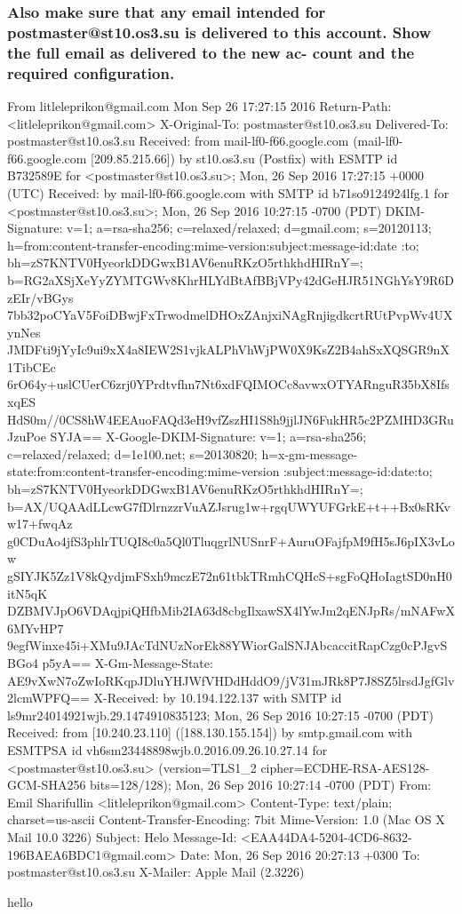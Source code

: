 \documentclass[a4paper,11pt]{article}
\begin{document}
\subsubsection{Also make sure that any email intended for postmaster@st10.os3.su is delivered to this account. Show the full email as delivered to the new ac- count and the required configuration.}
\begin{bashcode}
From litleleprikon@gmail.com  Mon Sep 26 17:27:15 2016
Return-Path: <litleleprikon@gmail.com>
X-Original-To: postmaster@st10.os3.su
Delivered-To: postmaster@st10.os3.su
Received: from mail-lf0-f66.google.com (mail-lf0-f66.google.com [209.85.215.66])
    by st10.os3.su (Postfix) with ESMTP id B732589E
    for <postmaster@st10.os3.su>; Mon, 26 Sep 2016 17:27:15 +0000 (UTC)
Received: by mail-lf0-f66.google.com with SMTP id b71so9124924lfg.1
        for <postmaster@st10.os3.su>; Mon, 26 Sep 2016 10:27:15 -0700 (PDT)
DKIM-Signature: v=1; a=rsa-sha256; c=relaxed/relaxed;
        d=gmail.com; s=20120113;
        h=from:content-transfer-encoding:mime-version:subject:message-id:date
         :to;
        bh=zS7KNTV0HyeorkDDGwxB1AV6enuRKzO5rthkhdHIRnY=;
        b=RG2aXSjXeYyZYMTGWv8KhrHLYdBtAfBBjVPy42dGeHJR51NGhYsY9R6DzEIr/vBGys
         7bb32poCYaV5FoiDBwjFxTrwodmelDHOxZAnjxiNAgRnjigdkcrtRUtPvpWv4UXynNes
         JMDFti9jYyIc9ui9xX4a8IEW2S1vjkALPhVhWjPW0X9KsZ2B4ahSxXQSGR9nX1TibCEc
         6rO64y+uslCUerC6zrj0YPrdtvfhn7Nt6xdFQIMOCc8avwxOTYARnguR35bX8IfsxqES
         HdS0m//0CS8hW4EEAuoFAQd3eH9vfZszHI1S8h9jjlJN6FukHR5c2PZMHD3GRuJzuPoe
         SYJA==
X-Google-DKIM-Signature: v=1; a=rsa-sha256; c=relaxed/relaxed;
        d=1e100.net; s=20130820;
        h=x-gm-message-state:from:content-transfer-encoding:mime-version
         :subject:message-id:date:to;
        bh=zS7KNTV0HyeorkDDGwxB1AV6enuRKzO5rthkhdHIRnY=;
        b=AX/UQAAdLLcwG7fDlrnzzrVuAZJsrug1w+rgqUWYUFGrkE+t++Bx0sRKvw17+fwqAz
         g0CDuAo4jfS3phlrTUQI8c0a5Ql0TluqgrlNUSnrF+AuruOFajfpM9fH5sJ6pIX3vLow
         gSIYJK5Zz1V8kQydjmFSxh9mczE72n61tbkTRmhCQHcS+sgFoQHoIagtSD0nH0itN5qK
         DZBMVJpO6VDAqjpiQHfbMib2IA63d8cbgIlxawSX4lYwJm2qENJpRs/mNAFwX6MYvHP7
         9egfWinxe45i+XMu9JAcTdNUzNorEk88YWiorGalSNJAbcaccitRapCzg0cPJgvSBGo4
         p5yA==
X-Gm-Message-State: AE9vXwN7oZwIoRKqpJDluYHJWfVHDdHddO9/jV31mJRk8P7J8SZ5lrsdJgfGlv2lcmWPFQ==
X-Received: by 10.194.122.137 with SMTP id ls9mr24014921wjb.29.1474910835123;
        Mon, 26 Sep 2016 10:27:15 -0700 (PDT)
Received: from [10.240.23.110] ([188.130.155.154])
        by smtp.gmail.com with ESMTPSA id vh6sm23448898wjb.0.2016.09.26.10.27.14
        for <postmaster@st10.os3.su>
        (version=TLS1_2 cipher=ECDHE-RSA-AES128-GCM-SHA256 bits=128/128);
        Mon, 26 Sep 2016 10:27:14 -0700 (PDT)
From: Emil Sharifullin <litleleprikon@gmail.com>
Content-Type: text/plain; charset=us-ascii
Content-Transfer-Encoding: 7bit
Mime-Version: 1.0 (Mac OS X Mail 10.0 \(3226\))
Subject: Helo
Message-Id: <EAA44DA4-5204-4CD6-8632-196BAEA6BDC1@gmail.com>
Date: Mon, 26 Sep 2016 20:27:13 +0300
To: postmaster@st10.os3.su
X-Mailer: Apple Mail (2.3226)

hello

\end{bashcode}
\end{document}
